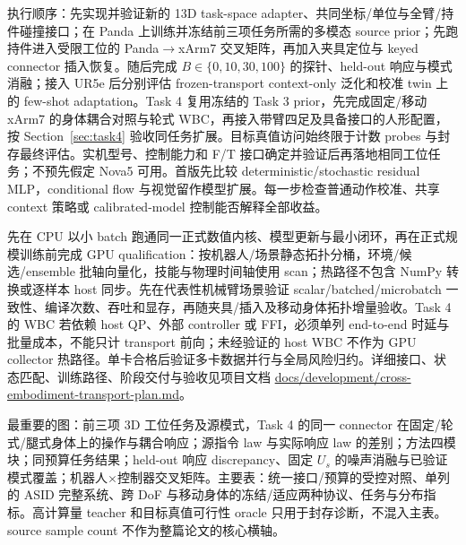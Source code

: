 \documentclass[11pt]{article}
\begin{document}
执行顺序：先实现并验证新的 13D task-space adapter、共同坐标/单位与全臂/持件碰撞接口；在 Panda 上训练并冻结前三项任务所需的多模态 source prior；先跑持件进入受限工位的 Panda$\to$xArm7 交叉矩阵，再加入夹具定位与 keyed connector 插入恢复。随后完成 $B\in\{0,10,30,100\}$ 的探针、held-out 响应与模式消融；接入 UR5e 后分别评估 frozen-transport context-only 泛化和校准 twin 上的 few-shot adaptation。Task 4 复用冻结的 Task 3 prior，先完成固定/移动 xArm7 的身体耦合对照与轮式 WBC，再接入带臂四足及具备接口的人形配置，按 Section~\ref{sec:task4} 验收同任务扩展。目标真值访问始终限于计数 probes 与封存最终评估。实机型号、控制能力和 F/T 接口确定并验证后再落地相同工位任务；不预先假定 Nova5 可用。首版先比较 deterministic/stochastic residual MLP，conditional flow 与视觉留作模型扩展。每一步检查普通动作校准、共享 context 策略或 calibrated-model 控制能否解释全部收益。

先在 CPU 以小 batch 跑通同一正式数值内核、模型更新与最小闭环，再在正式规模训练前完成 GPU qualification：按机器人/场景静态拓扑分桶，环境/候选/ensemble 批轴向量化，技能与物理时间轴使用 scan；热路径不包含 NumPy 转换或逐样本 host 同步。先在代表性机械臂场景验证 scalar/batched/microbatch 一致性、编译次数、吞吐和显存，再随夹具/插入及移动身体拓扑增量验收。Task 4 的 WBC 若依赖 host QP、外部 controller 或 FFI，必须单列 end-to-end 时延与批量成本，不能只计 transport 前向；未经验证的 host WBC 不作为 GPU collector 热路径。单卡合格后验证多卡数据并行与全局风险归约。详细接口、状态匹配、训练路径、阶段交付与验收见项目文档 \url{docs/development/cross-embodiment-transport-plan.md}。

最重要的图：前三项 3D 工位任务及源模式，Task 4 的同一 connector 在固定/轮式/腿式身体上的操作与耦合响应；源指令 law 与实际响应 law 的差别；方法四模块；同预算任务结果；held-out 响应 discrepancy、固定 $U_s$ 的噪声消融与已验证模式覆盖；机器人$\times$控制器交叉矩阵。主要表：统一接口/预算的受控对照、单列的 ASID 完整系统、跨 DoF 与移动身体的冻结/适应两种协议、任务与分布指标。高计算量 teacher 和目标真值可行性 oracle 只用于封存诊断，不混入主表。source sample count 不作为整篇论文的核心横轴。
\end{document}
